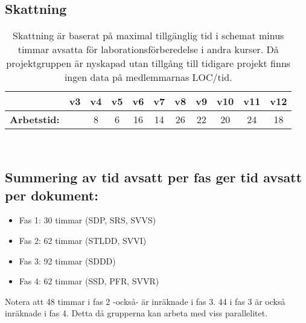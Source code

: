 \documentclass[paper=a4, fontsize=11pt,twoside]{article}
\begin{document}
\subsection*{Skattning}
\begin{table}[H]
\centering
\begin{tabular}{| l | c | c | c | c | c | c | c | c | c | c |}
\hline
 & \textbf{v3} & \textbf{v4} & \textbf{v5} & \textbf{v6} & \textbf{v7} & \textbf{v8} & \textbf{v9} & \textbf{v10} & \textbf{v11} & \textbf{v12}\\
\hline
\textbf{Arbetstid:}  &  & 8 & 6 & 16 & 14 & 26 & 22 & 20 & 24 & 18 \\
\hline
\end{tabular}\\
{ \fontsize{6pt}{0.2cm}\selectfont \caption{Skattning är baserat på maximal tillgänglig tid i schemat minus timmar avsatta för laborationsförberedelse i andra kurser. Då projektgruppen är nyskapad utan tillgång till tidigare projekt finns ingen data på medlemmarnas LOC/tid.}}
\end{table}


\subsection*{Summering av tid avsatt per fas ger tid avsatt per dokument:}
\begin{itemize}
\item Fas 1: 30 timmar (SDP, SRS, SVVS)
\item Fas 2: 62 timmar (STLDD, SVVI)
\item Fas 3: 92 timmar (SDDD)
\item Fas 4: 62 timmar (SSD, PFR, SVVR)
\end{itemize}
Notera att 48 timmar i fas 2 -också- är inräknade i fas 3. 44 i fas 3 är också inräknade i fas 4.
Detta då grupperna kan arbeta med viss parallelitet.
\end{document}
